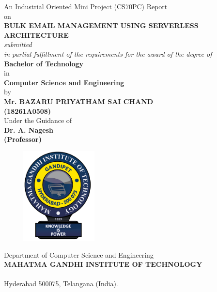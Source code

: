\documentclass[hidelinks]{thesis}
\begin{document}

\begin{titlepage}
    \begin{center}
	    An Industrial Oriented Mini Project (CS70PC) Report\\
	    on\\
        {\Large  \bfseries BULK EMAIL MANAGEMENT USING SERVERLESS ARCHITECTURE}\\

	\vspace{0.2cm}
	\emph{ submitted }\\
        \emph{ in partial fulfillment of the requirements for the award of the degree of }\\
        
        \textbf{Bachelor of Technology}\\
        in\\
        \textbf{Computer Science and Engineering}\\
        by\\
        \textbf{Mr. BAZARU PRIYATHAM SAI CHAND }\\
        \textbf{(18261A0508)}\\
       \vfill 
	Under the Guidance of\\
        \textbf{Dr. A. Nagesh}\\
        \textbf{(Professor)}\\

        \vfill
	\vspace{0.4cm}
        \begin{figure}[h]
            \centering
            \includegraphics[width=39mm]{figures/mgit_logo_1.png}
        \end{figure}

        \vfill
        Department of Computer Science and Engineering\\
        \textbf{MAHATMA GANDHI INSTITUTE OF TECHNOLOGY}\\
    \small {}\\
        Hyderabad 500075, Telangana (India).\\
        \small {}\\
    \end{center}
\end{titlepage}
\end{document}
